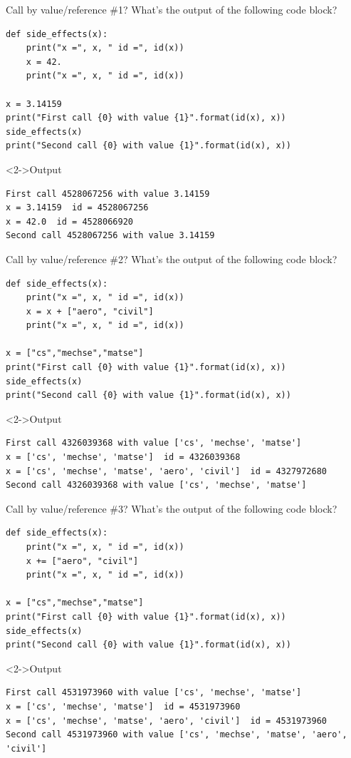 \documentclass[presentation]{beamer}
\begin{document}
\begin{frame}[label={sec:org91a3cd3},fragile]{Call by value/reference \#1?}
 What's the output of the following code block?
\footnotesize
\begin{verbatim}
def side_effects(x):
    print("x =", x, " id =", id(x))
    x = 42.
    print("x =", x, " id =", id(x))

x = 3.14159
print("First call {0} with value {1}".format(id(x), x))
side_effects(x)
print("Second call {0} with value {1}".format(id(x), x))
\end{verbatim}
\begin{block}<2->{Output}
\footnotesize
\begin{verbatim}
First call 4528067256 with value 3.14159
x = 3.14159  id = 4528067256
x = 42.0  id = 4528066920
Second call 4528067256 with value 3.14159
\end{verbatim}
\end{block}
\end{frame}
\begin{frame}[label={sec:org2071487},fragile]{Call by value/reference \#2?}
 What's the output of the following code block?
\footnotesize
\begin{verbatim}
def side_effects(x):
    print("x =", x, " id =", id(x))
    x = x + ["aero", "civil"]
    print("x =", x, " id =", id(x))

x = ["cs","mechse","matse"]
print("First call {0} with value {1}".format(id(x), x))
side_effects(x)
print("Second call {0} with value {1}".format(id(x), x))
\end{verbatim}
\begin{block}<2->{Output}
\scriptsize
\begin{verbatim}
First call 4326039368 with value ['cs', 'mechse', 'matse']
x = ['cs', 'mechse', 'matse']  id = 4326039368
x = ['cs', 'mechse', 'matse', 'aero', 'civil']  id = 4327972680
Second call 4326039368 with value ['cs', 'mechse', 'matse']
\end{verbatim}
\end{block}
\end{frame}
\begin{frame}[label={sec:org15b54a1},fragile]{Call by value/reference \#3?}
 What's the output of the following code block?
\footnotesize
\begin{verbatim}
def side_effects(x):
    print("x =", x, " id =", id(x))
    x += ["aero", "civil"]
    print("x =", x, " id =", id(x))

x = ["cs","mechse","matse"]
print("First call {0} with value {1}".format(id(x), x))
side_effects(x)
print("Second call {0} with value {1}".format(id(x), x))
\end{verbatim}
\begin{block}<2->{Output}
\scriptsize
\begin{verbatim}
First call 4531973960 with value ['cs', 'mechse', 'matse']
x = ['cs', 'mechse', 'matse']  id = 4531973960
x = ['cs', 'mechse', 'matse', 'aero', 'civil']  id = 4531973960
Second call 4531973960 with value ['cs', 'mechse', 'matse', 'aero', 'civil']
\end{verbatim}
\end{block}
\end{frame}
\end{document}
